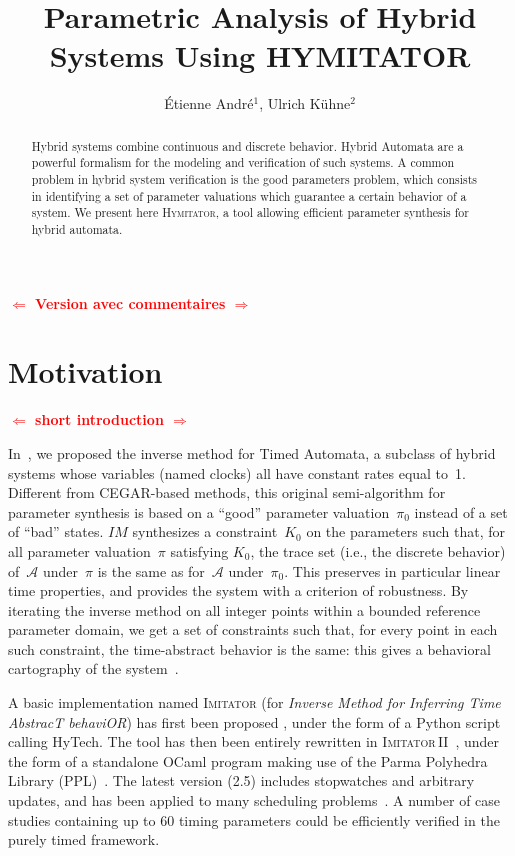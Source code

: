 \documentclass{llncs}
\title{Parametric Analysis of Hybrid Systems Using HYMITATOR}
\author{\'Etienne Andr\'e$^1$, %
	Ulrich K\"uhne$^2$%
	}
\institute{$^1$LIPN, CNRS UMR 7030, Université Paris 13, France \\
$^2$Universit\"at Bremen, Germany}
\newcommand{\A}{\mathcal{A}}
\newcommand{\Ko}{K_0}
\newcommand{\pio}{\pi_0}
\newcommand{\piprime}{\pi}
\newcommand{\IM}{\mathit{IM}}
\newcommand{\hytech}{{\sc HyTech}}
\newcommand{\imitator}{\textsc{Imitator}}
\newcommand{\imitatordeux}{\textsc{Imitator}\,II}
\newcommand{\hymitator}{\textsc{Hymitator}}
\newcommand{\ocaml}{OCaml}
\newcommand{\python}{Python}
\newcommand{\commentaire}[1]{\textcolor{red}{\textbf{$\Leftarrow$  #1 $\Rightarrow$}}}
\begin{document}
\maketitle

\begin{abstract}
	Hybrid systems combine continuous and discrete behavior. 
	Hybrid Automata are a powerful formalism for the modeling and verification of such systems.
	A common problem in hybrid system verification is the good parameters problem, which consists in identifying a set of parameter valuations which guarantee a certain behavior of a system.
	We present here \hymitator{}, a tool allowing efficient parameter synthesis for hybrid automata.
\end{abstract}


\commentaire{Version avec commentaires}


\section{Motivation}

\commentaire{short introduction}

In~\cite{acef09}, we proposed the inverse method for Timed Automata, a subclass of hybrid systems whose variables (named clocks) all have constant rates equal to~1.
Different from CEGAR-based methods, this original semi-algorithm for parameter synthesis is based on a ``good'' parameter valuation~$\pio$ instead of a set of ``bad'' states.
$\IM$ synthesizes a constraint~$\Ko$ on the parameters such that, for all parameter valuation~$\piprime$ satisfying $\Ko$, the trace set (i.e., the discrete behavior) of~$\A$ under~$\piprime$ is the same as for~$\A$ under~$\pio$.
This preserves in particular linear time properties, and provides the system with a criterion of robustness.
By iterating the inverse method on all integer points within a bounded reference parameter domain, we get a set of constraints %
such that, for every point in each such constraint, the time-abstract behavior is the same: this gives a behavioral cartography of the system~\cite{af10}.

A basic implementation named \imitator{} (for \emph{Inverse Method for Inferring Time AbstracT behaviOR}) has first been proposed%
, under the form of a \python{} script calling \hytech{}.
The tool has then been entirely rewritten in \imitatordeux{}~\cite{and10}, under the form of a standalone \ocaml{} program making use of the Parma Polyhedra Library (PPL)~\cite{bhz08}.
The latest version (2.5) includes stopwatches and arbitrary updates, and has been applied to many scheduling problems~\cite{afks12}.
A number of case studies containing up to 60 timing parameters could be efficiently verified in the purely timed framework.
\end{document}
